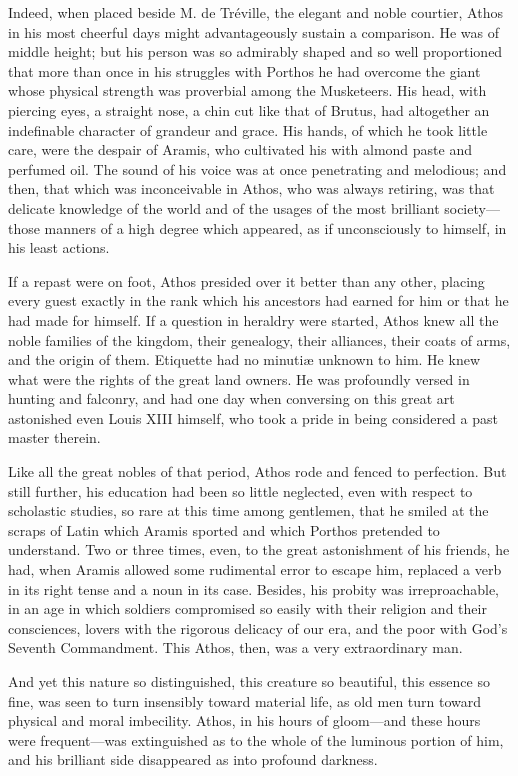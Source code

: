 Indeed, when placed beside M. de Tréville, the elegant and noble courtier, Athos in his most cheerful days might advantageously sustain a comparison. He was of middle height; but his person was so admirably shaped and so well proportioned that more than once in his struggles with Porthos he had overcome the giant whose physical strength was proverbial among the Musketeers. His head, with piercing eyes, a straight nose, a chin cut like that of Brutus, had altogether an indefinable character of grandeur and grace. His hands, of which he took little care, were the despair of Aramis, who cultivated his with almond paste and perfumed oil. The sound of his voice was at once penetrating and melodious; and then, that which was inconceivable in Athos, who was always retiring, was that delicate knowledge of the world and of the usages of the most brilliant society---those manners of a high degree which appeared, as if unconsciously to himself, in his least actions. 

If a repast were on foot, Athos presided over it better than any other, placing every guest exactly in the rank which his ancestors had earned for him or that he had made for himself. If a question in heraldry were started, Athos knew all the noble families of the kingdom, their genealogy, their alliances, their coats of arms, and the origin of them. Etiquette had no minutiæ unknown to him. He knew what were the rights of the great land owners. He was profoundly versed in hunting and falconry, and had one day when conversing on this great art astonished even Louis XIII himself, who took a pride in being considered a past master therein. 

Like all the great nobles of that period, Athos rode and fenced to perfection. But still further, his education had been so little neglected, even with respect to scholastic studies, so rare at this time among gentlemen, that he smiled at the scraps of Latin which Aramis sported and which Porthos pretended to understand. Two or three times, even, to the great astonishment of his friends, he had, when Aramis allowed some rudimental error to escape him, replaced a verb in its right tense and a noun in its case. Besides, his probity was irreproachable, in an age in which soldiers compromised so easily with their religion and their consciences, lovers with the rigorous delicacy of our era, and the poor with God's Seventh Commandment. This Athos, then, was a very extraordinary man. 

And yet this nature so distinguished, this creature so beautiful, this essence so fine, was seen to turn insensibly toward material life, as old men turn toward physical and moral imbecility. Athos, in his hours of gloom---and these hours were frequent---was extinguished as to the whole of the luminous portion of him, and his brilliant side disappeared as into profound darkness. 

